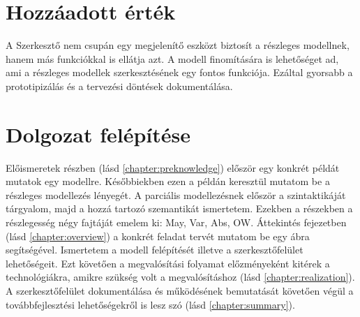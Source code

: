 \section{Hozzáadott érték}	
A Szerkesztő nem csupán egy megjelenítő eszközt biztosít a részleges modellnek, hanem más funkciókkal is ellátja azt. A modell finomítására is lehetőséget ad, ami a részleges modellek szerkesztésének egy fontos funkciója. Ezáltal gyorsabb a prototipizálás és a tervezési döntések dokumentálása.

\section{Dolgozat felépítése}
Előismeretek részben (lásd \autoref{chapter:preknowledge}) először egy konkrét példát mutatok egy modellre. Későbbiekben ezen a példán keresztül mutatom be a részleges modellezés lényegét. A parciális modellezésnek először a szintaktikáját tárgyalom, majd a hozzá tartozó szemantikát ismertetem. Ezekben a részekben a részlegesség négy fajtáját emelem ki: May, Var, Abs, OW. Áttekintés fejezetben (lásd \autoref{chapter:overview}) a konkrét feladat tervét mutatom be egy ábra segítségével. Ismertetem a modell felépítését illetve a szerkesztőfelület lehetőségeit. Ezt követően a megvalósítási folyamat előzményeként kitérek a technológiákra, amikre szükség volt a megvalósításhoz (lásd \autoref{chapter:realization}). A szerkesztőfelület dokumentálása és működésének bemutatását követően végül a továbbfejlesztési lehetőségekről is lesz szó (lásd \autoref{chapter:summary}). 

